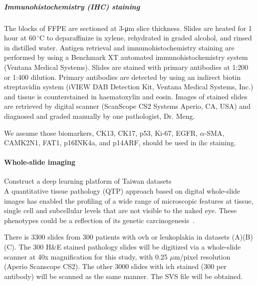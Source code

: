 \documentclass[12pt, a4paper]{article}
\begin{document}
\subparagraph{Immunohistochemistry (IHC) staining}

The blocks of FFPE are sectioned at 3-\si{\um} slice thickness. Slides are heated for 1 hour at $60\,^{\circ}\mathrm{C}$ to deparaffinize in xylene, rehydrated in graded alcohol, and rinsed in distilled water. Antigen retrieval and immunohistochemistry staining are performed by using a Benchmark XT automated immunohistochemistry system (Ventana Medical Systems). 
Slides are stained with primary antibodies at 1:200 or 1:400 dilution. Primary antibodies are detected by using an indirect biotin streptavidin system (iVIEW DAB Detection Kit, Ventana Medical Systems, Inc.) and tissue is counterstained in haematoxylin and eosin. Images of stained slides are retrieved by digital scanner (ScanScope CS2 Systems Aperio, CA, USA) and diagnosed and graded manually by one pathologist, Dr. Meng.

We assume those biomarkers, CK13, CK17, p53, Ki-67, EGFR, $\alpha$-SMA, CAMK2N1, FAT1, p16INK4a, and p14ARF, should be used in \acrshort{ihc} staining.

\paragraph*{Whole-slide imaging} Construct a deep learning platform of Taiwan datasets\\[0.5cm]

A quantitative tissue pathology (QTP) approach based on digital whole-slide images has enabled the profiling of a wide range of microscopic features at tissue, single cell and subcellular levels that are not visible to the naked eye. These phenotypes could be a reflection of its genetic carcinogenesis~\cite{Crawford2022}.

There is 3300 slides from 300 patients with \acrshort{ovh} or leukoplakia in datasets (A)(B)(C).
The 300 H\&E stained pathology slides will be digitized via a whole-slide scanner at 40x magnification for this study, with 0.25 $\mu$m/pixel resolution (Aperio Scanscope CS2).
The other 3000 slides with \acrshort{ich} stained (300 per antibody) will be scanned as the same manner.
The SVS file will be obtained.
\end{document}
